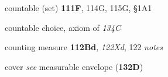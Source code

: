 countable (set) {\bf 111F}, 114G, 115G, \S1A1







countable choice, axiom of {\it 134C}























































counting measure {\bf 112Bd}, {\it 122Xd}, 122 {\it notes}








cover {\it see} measurable envelope ({\bf 132D})




































